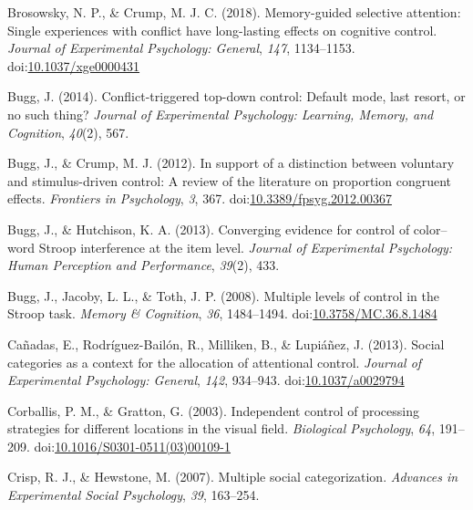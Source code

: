 \documentclass[english,,man,floatsintext]{apa6}
\begin{document}
\leavevmode\hypertarget{ref-brosowsky_memory-guided_2018}{}%
Brosowsky, N. P., \& Crump, M. J. C. (2018). Memory-guided selective attention: Single experiences with conflict have long-lasting effects on cognitive control. \emph{Journal of Experimental Psychology: General}, \emph{147}, 1134--1153. doi:\href{https://doi.org/10.1037/xge0000431}{10.1037/xge0000431}

\leavevmode\hypertarget{ref-bugg_conflict-triggered_2014}{}%
Bugg, J. (2014). Conflict-triggered top-down control: Default mode, last resort, or no such thing? \emph{Journal of Experimental Psychology: Learning, Memory, and Cognition}, \emph{40}(2), 567.

\leavevmode\hypertarget{ref-bugg_support_2012}{}%
Bugg, J., \& Crump, M. J. (2012). In support of a distinction between voluntary and stimulus-driven control: A review of the literature on proportion congruent effects. \emph{Frontiers in Psychology}, \emph{3}, 367. doi:\href{https://doi.org/10.3389/fpsyg.2012.00367}{10.3389/fpsyg.2012.00367}

\leavevmode\hypertarget{ref-bugg_converging_2013}{}%
Bugg, J., \& Hutchison, K. A. (2013). Converging evidence for control of color--word Stroop interference at the item level. \emph{Journal of Experimental Psychology: Human Perception and Performance}, \emph{39}(2), 433.

\leavevmode\hypertarget{ref-bugg_multiple_2008}{}%
Bugg, J., Jacoby, L. L., \& Toth, J. P. (2008). Multiple levels of control in the Stroop task. \emph{Memory \& Cognition}, \emph{36}, 1484--1494. doi:\href{https://doi.org/10.3758/MC.36.8.1484}{10.3758/MC.36.8.1484}

\leavevmode\hypertarget{ref-canadas_social_2013}{}%
Cañadas, E., Rodríguez-Bailón, R., Milliken, B., \& Lupiáñez, J. (2013). Social categories as a context for the allocation of attentional control. \emph{Journal of Experimental Psychology: General}, \emph{142}, 934--943. doi:\href{https://doi.org/10.1037/a0029794}{10.1037/a0029794}

\leavevmode\hypertarget{ref-corballis_independent_2003}{}%
Corballis, P. M., \& Gratton, G. (2003). Independent control of processing strategies for different locations in the visual field. \emph{Biological Psychology}, \emph{64}, 191--209. doi:\href{https://doi.org/10.1016/S0301-0511(03)00109-1}{10.1016/S0301-0511(03)00109-1}

\leavevmode\hypertarget{ref-crisp_multiple_2007}{}%
Crisp, R. J., \& Hewstone, M. (2007). Multiple social categorization. \emph{Advances in Experimental Social Psychology}, \emph{39}, 163--254.
\end{document}
